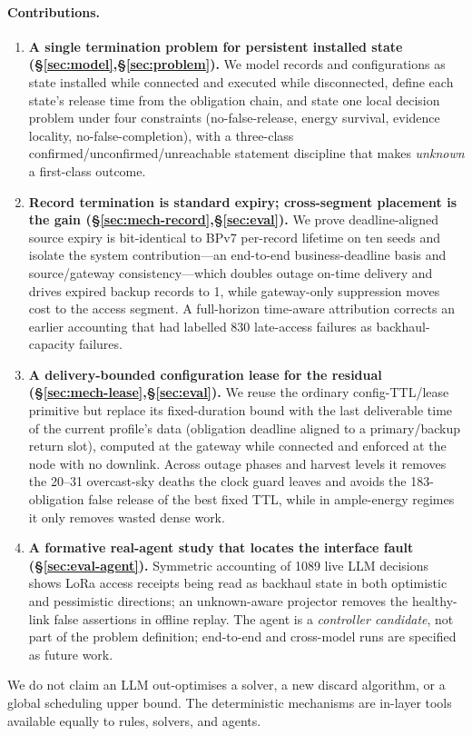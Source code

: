 \documentclass[11pt]{article}
\begin{document}
\paragraph{Contributions.}
\begin{enumerate}[leftmargin=*,itemsep=2pt]
\item \textbf{A single termination problem for persistent installed state
(\S\ref{sec:model},\S\ref{sec:problem}).} We model records and configurations as state installed
while connected and executed while disconnected, define each state's release time from the
obligation chain, and state one local decision problem under four constraints (no-false-release,
energy survival, evidence locality, no-false-completion), with a three-class
confirmed/unconfirmed/unreachable statement discipline that makes \emph{unknown} a first-class
outcome.
\item \textbf{Record termination is standard expiry; cross-segment placement is the gain
(\S\ref{sec:mech-record},\S\ref{sec:eval}).} We prove deadline-aligned source expiry is
bit-identical to BPv7 per-record lifetime on ten seeds and isolate the system contribution---an
end-to-end business-deadline basis and source/gateway consistency---which doubles outage on-time
delivery and drives expired backup records to 1, while gateway-only suppression moves cost to the
access segment. A full-horizon time-aware attribution corrects an earlier accounting that had
labelled 830 late-access failures as backhaul-capacity failures.
\item \textbf{A delivery-bounded configuration lease for the residual
(\S\ref{sec:mech-lease},\S\ref{sec:eval}).} We reuse the ordinary config-TTL/lease primitive but
replace its fixed-duration bound with the last deliverable time of the current profile's data
(obligation deadline aligned to a primary/backup return slot), computed at the gateway while
connected and enforced at the node with no downlink. Across outage phases and harvest levels it
removes the 20--31 overcast-sky deaths the clock guard leaves and avoids the 183-obligation false
release of the best fixed TTL, while in ample-energy regimes it only removes wasted dense work.
\item \textbf{A formative real-agent study that locates the interface fault
(\S\ref{sec:eval-agent}).} Symmetric accounting of 1089 live LLM decisions shows LoRa access
receipts being read as backhaul state in both optimistic and pessimistic directions; an
unknown-aware projector removes the healthy-link false assertions in offline replay. The agent is a
\emph{controller candidate}, not part of the problem definition; end-to-end and cross-model runs are
specified as future work.
\end{enumerate}
We do not claim an LLM out-optimises a solver, a new discard algorithm, or a global scheduling
upper bound. The deterministic mechanisms are in-layer tools available equally to rules, solvers,
and agents.
\end{document}
